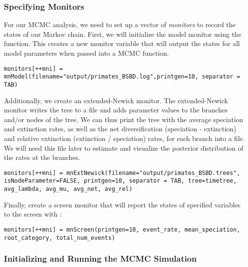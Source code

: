 \subsubsection{Specifying Monitors}

For our MCMC analysis, we need to set up a vector of \textit{monitors} to record the states of our Markov chain.
First, we will initialize the model monitor using the  function.
This creates a new monitor variable that will output the states for all model parameters when passed into a MCMC function.
{\tt \begin{snugshade*}
\begin{lstlisting}
monitors[++mni] = mnModel(filename="output/primates_BSBD.log",printgen=10, separator = TAB)
\end{lstlisting}
\end{snugshade*}}

Additionally, we create an extended-Newick monitor.
The extended-Newick monitor writes the tree to a file and adds parameter values to the branches and/or nodes of the tree.
We can thus print the tree with the average speciation and extinction rates, as well as the net diversification (speciation - extinction) and relative extinction (extinction / speciation) rates, for each branch into a file.
We will need this file later to estimate and visualize the posterior distribution of the rates at the branches.
{\tt \begin{snugshade*}
\begin{lstlisting}
monitors[++mni] = mnExtNewick(filename="output/primates_BSBD.trees", isNodeParameter=FALSE, printgen=10, separator = TAB, tree=timetree, avg_lambda, avg_mu, avg_net, avg_rel)
\end{lstlisting}
\end{snugshade*}}

Finally, create a screen monitor that will report the states of specified variables to the screen with :
{\tt \begin{snugshade*}
\begin{lstlisting}
monitors[++mni] = mnScreen(printgen=10, event_rate, mean_speciation, root_category, total_num_events)
\end{lstlisting}
\end{snugshade*}}

\subsubsection{Initializing and Running the MCMC Simulation}


